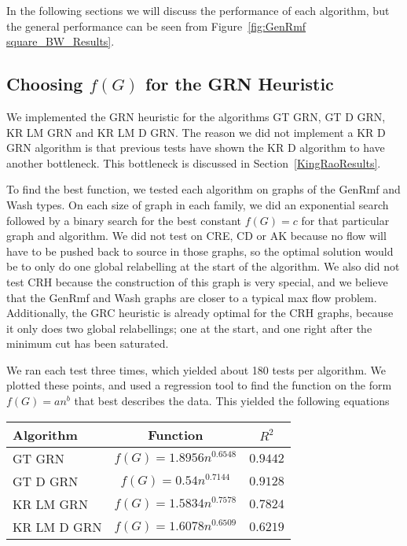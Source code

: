 In the following sections we will discuss the performance of each algorithm, but the general performance can be seen from Figure~\ref{fig:GenRmf square_BW_Results}.

\subsection{Choosing $f(G)$ for the GRN Heuristic}
\label{GRNFGSection}

We implemented the GRN heuristic for the algorithms GT GRN, GT D GRN, KR LM GRN and KR LM D GRN. 
The reason we did not implement a KR D GRN algorithm is that previous tests have shown the KR D algorithm to have another bottleneck.
This bottleneck is discussed in Section~\ref{KingRaoResults}.

To find the best function, we tested each algorithm on graphs of the GenRmf and Wash types. 
On each size of graph in each family, we did an exponential search followed by a binary search for the best constant $f(G)=c$ for that particular graph and algorithm.
We did not test on CRE, CD or AK because no flow will have to be pushed back to source in those graphs, so the optimal solution would be to only do one global relabelling at the start of the algorithm.
We also did not test CRH because the construction of this graph is very special, and we believe that the GenRmf and Wash graphs are closer to a typical max flow problem.
Additionally, the GRC heuristic is already optimal for the CRH graphs, because it only does two global relabellings; one at the start, and one right after the minimum cut has been saturated.

We ran each test three times, which yielded about 180 tests per algorithm. We plotted these points, and used a regression tool to find the function on the form $f(G)=an^b$ that best describes the data.
This yielded the following equations

\begin{tabular}{|l|c|c|}
    \hline
    Algorithm & Function & $R^2$ \\\hline\hline
    GT GRN&$f(G)=1.8956n^{0.6548}$&$0.9442$\\\hline
    GT D GRN&$f(G)=0.54n^{0.7144}$&$0.9128$\\\hline
    KR LM GRN&$f(G)=1.5834n^{0.7578}$&$0.7824$\\\hline
    KR LM D GRN&$f(G)=1.6078n^{0.6509}$&$0.6219$\\\hline   
\end{tabular}
\\

